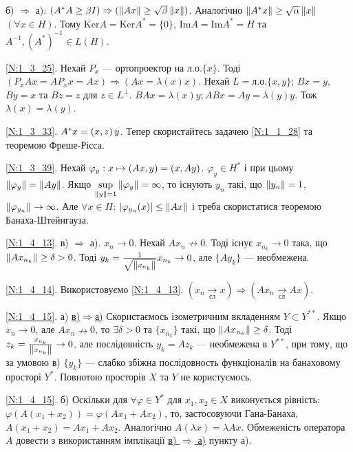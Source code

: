 \noindent б) $\Rightarrow$ а): $(A^* A \geq \beta I) \Rightarrow (\left\lVert Ax\right\rVert \geq 
\sqrt{\beta}\left\lVert x\right\rVert)$. Аналогічно $\left\lVert A^* x\right\rVert \geq \sqrt{\alpha}\left\lVert x\right\rVert$ $(\forall x \in H)$.
Тому $\mathrm{Ker}A = \mathrm{Ker}A^* = \{0\}$, $\mathrm{Im}A = \mathrm{Im}A^* = H$ та
$A^{-1}, (A^*)^{-1} \in L(H)$.

\noindent\ref{N:1_3_25}. Нехай $P_x$ --- ортопроектор на л.о.$\{x\}$. Тоді $(P_x Ax = 
AP_x x = Ax) \Rightarrow (Ax = \lambda(x)x)$. Нехай $L = \text{л.о.}\{x,y\}$;
$Bx = y$, $By = x$ та $Bz = z$ для $z \in L^\perp$. $BAx = \lambda(x)y; ABx = Ay = \lambda(y)y$.
Тож $\lambda(x) = \lambda(y)$.

\noindent\ref{N:1_3_33}. $A^* x = \left(x, z\right)y$. Тепер скористайтесь задачею \ref{N:1_1_28}
та теоремою Фреше-Рісса.

\noindent\ref{N:1_3_39}. Нехай $\varphi_y: x \mapsto \left(Ax, y\right) = \left(x, Ay\right)$.
$\varphi_y \in H^*$ і при цьому $\left\lVert\varphi_y\right\rVert = \left\lVert Ay\right\rVert$. Якщо 
$\underset{\left\lVert y\right\rVert=1}{\sup} \left\lVert\varphi_y\right\rVert = \infty$, то існують $y_n$ такі,
що $\left\lVert y_n\right\rVert = 1$, $\left\lVert\varphi_{y_n}\right\rVert \to \infty$.
Але $\forall x \in H$: $|\varphi_{y_n}(x)| \leq \left\lVert Ax\right\rVert$ і треба скористатися теоремою Банаха-Штейнгауза.

\noindent\ref{N:1_4_13}. в) $\Rightarrow$ а). $x_n \rightarrow 0$. Нехай $A x_n \not\rightarrow 0$. Тоді існує
$x_{n_k} \rightarrow 0$ така, що $\left\lVert A x_{n_k}\right\rVert \geq \delta > 0$. Тоді 
$y_k = \frac{1}{\sqrt{\left\lVert x_{n_k}\right\rVert}} x_{n_k} \rightarrow 0$, але $\{A y_k\}$ --- необмежена.

\noindent\ref{N:1_4_14}. Використовуємо \ref{N:1_4_13}. $(x_n \xrightarrow[\text{сл}]{} x) \Rightarrow (Ax_n \xrightarrow[\text{сл}]{} Ax)$.

\noindent\ref{N:1_4_15}. а) \ul{в)$\Rightarrow$а)} Скористаємось ізометричним вкладенням $Y \subset 
Y^{**}$. Якщо $x_n \rightarrow 0$, але $Ax_n \nrightarrow 0$, то $\exists \delta > 0$ та 
$\{x_{n_k}\}$ такі, що $\left\lVert Ax_{n_k}\right\rVert \geq \delta$. Тоді $z_k = 
\frac{x_{n_k}}{\left\lVert x_{n_k}\right\rVert} \rightarrow 0$, але послідовність $y_k = Az_k$ --- необмежена 
в $Y^{**}$, при тому, що за умовою в) $\{y_k\}$ --- слабко збіжна послідовность функціоналів на 
банаховому просторі $Y^*$. Повнотою просторів $X$ та $Y$ не користуємось.

\noindent\ref{N:1_4_15}. б) Оскільки для $\forall \varphi \in Y^*$ для $x_1, x_2 \in X$ 
виконується рівність: $\varphi(A(x_1 + x_2)) = \varphi(Ax_1 + Ax_2)$, то, застосовуючи Гана-Банаха, 
$A(x_1 + x_2) = Ax_1 + Ax_2$. Аналогічно $A(\lambda x) = \lambda Ax$. Обмеженість оператора $A$ 
довести з використанням імплікації \ul{в) $\Rightarrow$ а)} пункту а).

